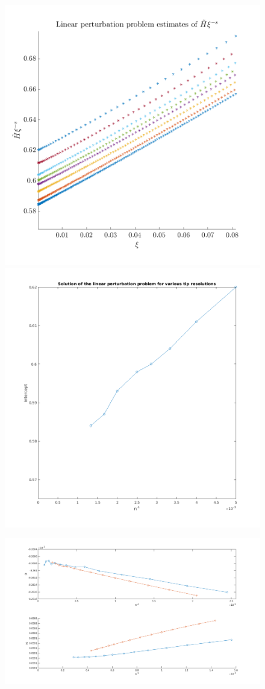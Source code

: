\documentclass{article}
\begin{document}
\begin{figure}[!ht]\centering
\includegraphics[scale=0.5]{linear-perturbation.png}
\includegraphics[scale=0.45]{resolution-effect.png}
\end{figure}
\begin{figure}[!ht]\centering
\includegraphics[scale=0.6,angle=90]{l0-D-too-far.png}
\end{figure}
\end{document}
